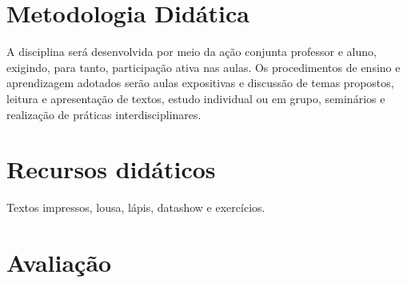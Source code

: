 \documentclass[
]{book}
\begin{document}
\hypertarget{metodologia-diduxe1tica}{%
\section{Metodologia Didática}\label{metodologia-diduxe1tica}}

A disciplina será desenvolvida por meio da ação conjunta professor e aluno, exigindo, para tanto, participação ativa nas aulas. Os procedimentos de ensino e aprendizagem adotados serão aulas expositivas e discussão de temas propostos, leitura e apresentação de textos, estudo individual ou em grupo, seminários e realização de práticas interdisciplinares.

\hypertarget{recursos-diduxe1ticos}{%
\section{Recursos didáticos}\label{recursos-diduxe1ticos}}

Textos impressos, lousa, lápis, datashow e exercícios.

\hypertarget{avaliauxe7uxe3o}{%
\section{Avaliação}\label{avaliauxe7uxe3o}}
\end{document}
